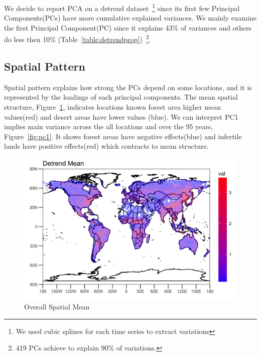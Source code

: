 \documentclass[11pt]{article}
\begin{document}
We decide to report PCA on a detrend dataset~\footnote{We used cubic splines for each time series to extract variations} since its first few Principal Components(PCs) have more cumulative explained variances. We mainly examine the first Principal Component(PC) since it explains 43\% of variances and others do less then 10\% (Table~\ref{table:detrendprop})~\footnote{419 PCs achieve to explain 90\% of variations.}.

\subsection{Spatial Pattern}
Spatial pattern explains how strong the PCs depend on some locations, and it is represented by the loadings of each principal components. The mean spatial structure, Figure~\ref{fig:scalepcade}, indicates locations known forest area higher mean values(red) and desert areas have lower values (blue).  We can interpret PC1 implies main variance across the all locations and over the 95 years, Figure~\ref{fig:pc1}. It shows forest areas have negative effects(blue) and infertile lands have positive effects(red) which contracts to mean structure. 
\begin{figure}
	\centering
	\includegraphics[width=0.7\linewidth]{../img/Scale_PCA_de}
	\caption{Overall Spatial Mean}
	\label{fig:scalepcade}
\end{figure}
\end{document}
